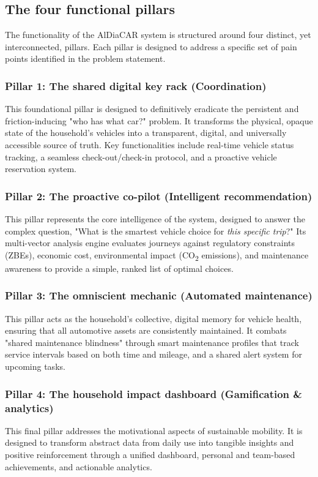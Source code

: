 \subsection{The four functional pillars}
The functionality of the AlDiaCAR system is structured around four distinct, yet interconnected, pillars. Each pillar is designed to address a specific set of pain points identified in the problem statement.

\subsubsection{Pillar 1: The shared digital key rack (Coordination)}
This foundational pillar is designed to definitively eradicate the persistent and friction-inducing "who has what car?" problem. It transforms the physical, opaque state of the household's vehicles into a transparent, digital, and universally accessible source of truth. Key functionalities include real-time vehicle status tracking, a seamless check-out/check-in protocol, and a proactive vehicle reservation system.

\subsubsection{Pillar 2: The proactive co-pilot (Intelligent recommendation)}
This pillar represents the core intelligence of the system, designed to answer the complex question, "What is the smartest vehicle choice for \textit{this specific trip}?" Its multi-vector analysis engine evaluates journeys against regulatory constraints (ZBEs), economic cost, environmental impact (CO\textsubscript{2} emissions), and maintenance awareness to provide a simple, ranked list of optimal choices.

\subsubsection{Pillar 3: The omniscient mechanic (Automated maintenance)}
This pillar acts as the household's collective, digital memory for vehicle health, ensuring that all automotive assets are consistently maintained. It combats "shared maintenance blindness" through smart maintenance profiles that track service intervals based on both time and mileage, and a shared alert system for upcoming tasks.

\subsubsection{Pillar 4: The household impact dashboard (Gamification \& analytics)}
This final pillar addresses the motivational aspects of sustainable mobility. It is designed to transform abstract data from daily use into tangible insights and positive reinforcement through a unified dashboard, personal and team-based achievements, and actionable analytics.

